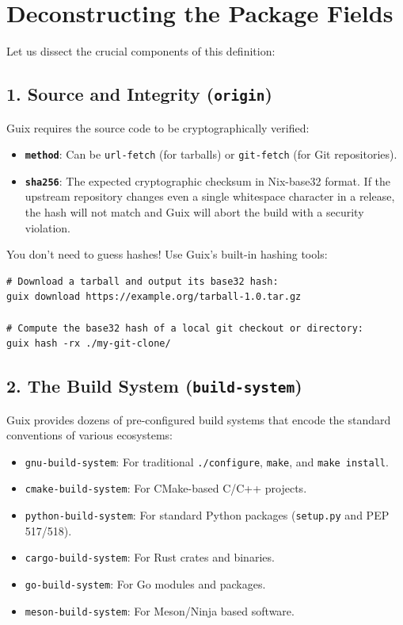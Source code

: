 \section{Deconstructing the Package Fields}

Let us dissect the crucial components of this definition:

\subsection{1. Source and Integrity (\texttt{origin})}
Guix requires the source code to be cryptographically verified:
\begin{itemize}
  \item \textbf{\texttt{method}}: Can be \texttt{url-fetch} (for tarballs) or \texttt{git-fetch} (for Git repositories).
  \item \textbf{\texttt{sha256}}: The expected cryptographic checksum in Nix-base32 format. If the upstream repository changes even a single whitespace character in a release, the hash will not match and Guix will abort the build with a security violation.
\end{itemize}

\begin{protipbox}
You don't need to guess hashes! Use Guix's built-in hashing tools:
\begin{lstlisting}[style=guixcli]
# Download a tarball and output its base32 hash:
guix download https://example.org/tarball-1.0.tar.gz

# Compute the base32 hash of a local git checkout or directory:
guix hash -rx ./my-git-clone/
\end{lstlisting}
\end{protipbox}

\subsection{2. The Build System (\texttt{build-system})}
Guix provides dozens of pre-configured build systems that encode the standard conventions of various ecosystems:
\begin{itemize}
  \item \texttt{gnu-build-system}: For traditional \texttt{./configure}, \texttt{make}, and \texttt{make install}.
  \item \texttt{cmake-build-system}: For CMake-based C/C++ projects.
  \item \texttt{python-build-system}: For standard Python packages (\texttt{setup.py} and PEP 517/518).
  \item \texttt{cargo-build-system}: For Rust crates and binaries.
  \item \texttt{go-build-system}: For Go modules and packages.
  \item \texttt{meson-build-system}: For Meson/Ninja based software.
\end{itemize}

